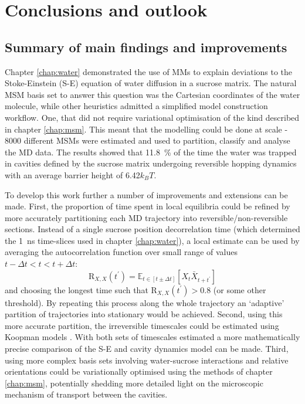 \let\textcircled=\pgftextcircled
\chapter{Conclusions and outlook}
\label{chap:conclusions}


\section{Summary of main findings and improvements}
Chapter \ref{chap:water} demonstrated the use of MMs to explain deviations to the Stoke-Einstein (S-E) equation of water diffusion in a sucrose matrix. The natural MSM basis set to answer this question was the Cartesian coordinates of the water molecule, while other heuristics admitted a simplified model construction workflow. One, that  did not require variational optimisation of the kind described in chapter \ref{chap:msm}. This meant that the modelling could be done at scale - 8000 different MSMs were estimated and used to partition, classify and analyse the MD data. The results showed that \SI{11.8}{\percent} of the time the water was trapped in cavities defined by the sucrose matrix undergoing reversible hopping dynamics with an average barrier height of \num{6.42}$k_{B}T$. 

To develop this work further a number of improvements and extensions can be made. First, the proportion of time spent in local equilibria could be refined by more accurately partitioning each MD trajectory into reversible/non-reversible sections. Instead of a single sucrose position decorrelation time (which determined the \SI{1}{\nano\second} time-slices used in chapter \ref{chap:water}), a local estimate can be used by averaging the autocorrelation function over small range of values $t-\Delta t < t < t+\Delta t$:
\begin{equation}
\mathrm{R}_{X,  X}(t^{\prime})=\mathbb{E}_{t \in [t\pm\Delta t]}\left[X_{t} \bar{X}_{t+t^{\prime}}\right]
\end{equation}
and choosing the longest time such that $\mathrm{R}_{X,  X}(t^{\prime}) > 0.8$ (or some other threshold). By repeating this process along the whole trajectory an `adaptive' partition of trajectories into stationary would be achieved. Second, using this more accurate partition, the irreversible timescales could be estimated using Koopman models \cite{wuVariationalKoopmanModels2017}. With both sets of timescales estimated a more mathematically precise comparison of the S-E and cavity dynamics model can be made. Third, using more complex basis sets involving water-sucrose interactions and relative orientations could be variationally  optimised using the methods of chapter \ref{chap:msm}, potentially shedding more detailed light on the microscopic mechanism of transport between the cavities. 

